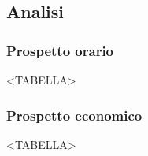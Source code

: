 \subsection{Analisi}

\subsubsection{Prospetto orario}

<TABELLA>

\subsubsection{Prospetto economico}

<TABELLA>


